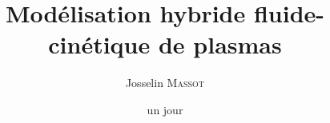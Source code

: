 





\author{Josselin \textsc{Massot}}

\title{Modélisation hybride fluide-cinétique de plasmas}

\def\thetitleEN{Fluid-kinetic hybrid model of plasmas}

\date{un jour}


\numthese{} %

